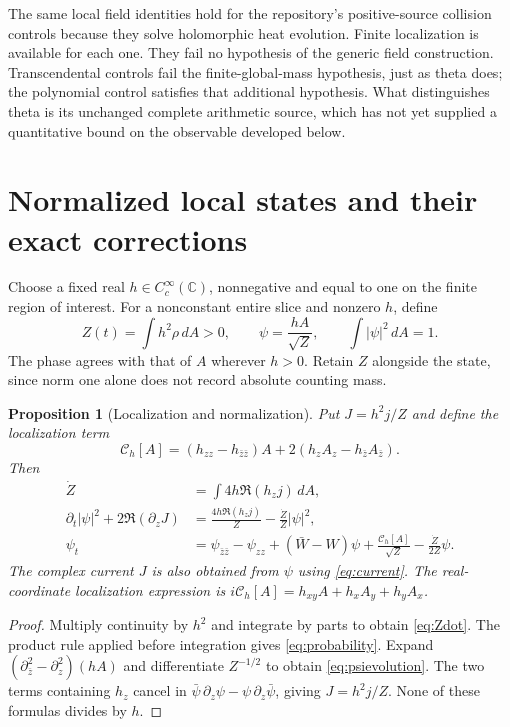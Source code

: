 \documentclass[11pt]{article}
\newcommand{\C}{\mathbb C}
\newcommand{\dd}{\,d}
\newtheorem{proposition}[theorem]{Proposition}
\theoremstyle{definition}
\theoremstyle{remark}
\begin{document}
The same local field identities hold for the repository's positive-source
collision controls because they solve holomorphic heat evolution.
Finite localization is available for each one. They fail no hypothesis
of the generic field construction. Transcendental controls fail the
finite-global-mass hypothesis, just as theta does; the polynomial
control satisfies that additional hypothesis. What distinguishes theta is its
unchanged complete arithmetic source, which has not yet supplied a
quantitative bound on the observable developed below.

\section{Normalized local states and their exact corrections}
\label{sec:window}

Choose a fixed real $h\in C_c^\infty(\C)$, nonnegative and equal
to one on the finite region of interest. For a nonconstant entire
slice and nonzero $h$, define
\begin{equation}
 Z(t)=\int h^2\rho\dd A>0,\qquad
 \psi=\frac{hA}{\sqrt Z},\qquad \int|\psi|^2\dd A=1.
 \label{eq:localstate}
\end{equation}
The phase agrees with that of $A$ wherever $h>0$. Retain $Z$
alongside the state, since norm one alone does not record absolute
counting mass.

\begin{proposition}[Localization and normalization]
Put $J=h^2j/Z$ and define the localization term
\begin{equation}
 \mathcal C_h[A]=(h_{zz}-h_{\bar z\bar z})A
       +2(h_zA_z-h_{\bar z}A_{\bar z}).
 \label{eq:localizationterm}
\end{equation}
Then
\begin{align}
 \dot Z&=\int 4h\Re(h_zj)\dd A,
 \label{eq:Zdot}\\
 \partial_t|\psi|^2+2\Re(\partial_z J)
 &=\frac{4h\Re(h_zj)}{Z}
   -\frac{\dot Z}{Z}|\psi|^2,\label{eq:probability}\\
 \psi_t&=\psi_{\bar z\bar z}-\psi_{zz}+(\bar W-W)\psi
 +\frac{\mathcal C_h[A]}{\sqrt Z}
 -\frac{\dot Z}{2Z}\psi.\label{eq:psievolution}
\end{align}
The complex current $J$ is also obtained from $\psi$ using
\eqref{eq:current}. The real-coordinate localization expression is
$i\mathcal C_h[A]=h_{xy}A+h_xA_y+h_yA_x$.
\end{proposition}
\begin{proof}
Multiply continuity by $h^2$ and integrate by parts to obtain
\eqref{eq:Zdot}. The product rule applied before integration gives
\eqref{eq:probability}. Expand
$(\partial_{\bar z}^2-\partial_z^2)(hA)$ and differentiate
$Z^{-1/2}$ to obtain \eqref{eq:psievolution}. The two terms
containing $h_z$ cancel in
$\bar\psi\,\partial_z\psi-\psi\,\partial_z\bar\psi$,
giving $J=h^2j/Z$. None of these formulas divides by $h$.
\end{proof}
\end{document}
